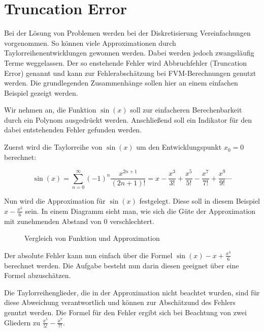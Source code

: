 \documentclass[11pt, ngerman,colorback,accentcolor=tud2d]{tudreport}
\begin{document}
\chapter{Truncation Error}

Bei der Lösung von Problemen werden bei der Diskretisierung Vereinfachungen vorgenommen.
So können viele Approximationen durch Taylorreihenentwicklungen gewonnen werden. Dabei
werden jedoch zwangsläufig Terme weggelassen. Der so enstehende Fehler wird
Abbruchfehler (Truncation Error) genannt und kann zur Fehlerabschätzung bei FVM-Berechnungen
genutzt werden. Die grundlegenden Zusammenhänge sollen hier an einem einfachen
Beispiel gezeigt werden.

Wir nehmen an, die Funktion $\sin(x)$ soll zur einfacheren Berechenbarkeit durch
ein Polynom ausgedrückt werden. Anschließend soll ein Indikator für den dabei
entstehenden Fehler gefunden werden.

Zuerst wird die Taylorreihe von $\sin(x)$ um den Entwicklungspunkt $x_0 =0$ berechnet:

\begin{equation}
  \sin(x) = \sum_{n=0}^{\infty}(-1)^n \frac{x^{2n+1}}{(2n+1)!} = 
  x-\frac{x^3}{3!} +\frac{x^5}{5!} -\frac{x^7}{7!} +\frac{x^9}{9!}\cdots
\end{equation}

Nun wird die Approximation für $\sin(x)$ festgelegt. Diese soll in diesem Beispiel
$x-\frac{x^3}{6} $ sein. In einem Diagramm sieht man, wie sich die Güte der
Approximation mit zunehmenden Abstand von $0$ verschlechtert.

\begin{figure}[ht]
\centering
\caption{Vergleich von Funktion und Approximation}
\end{figure}

Der absolute Fehler kann nun einfach über die Formel $\sin(x) - x + \frac{x^3}{6}$
berechnet werden. Die Aufgabe besteht nun darin diesen geeignet über eine Formel abzuschätzen.

Die Taylorreihenglieder, die in der Approximation nicht beachtet wurden, sind für diese
Abweichung verantwortlich und können zur Abschätzund des Fehlers genutzt werden.
Die Formel für den Fehler ergibt sich bei Beachtung von zwei Gliedern zu
$\frac{x^5}{5!} -\frac{x^7}{7!} $.
\end{document}
